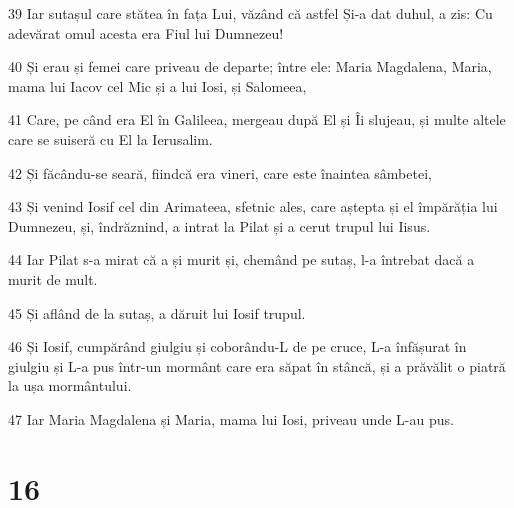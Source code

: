 \par 39 Iar sutașul care stătea în fața Lui, văzând că astfel Și-a dat duhul, a zis: Cu adevărat omul acesta era Fiul lui Dumnezeu!
\par 40 Și erau și femei care priveau de departe; între ele: Maria Magdalena, Maria, mama lui Iacov cel Mic și a lui Iosi, și Salomeea,
\par 41 Care, pe când era El în Galileea, mergeau după El și Îi slujeau, și multe altele care se suiseră cu El la Ierusalim.
\par 42 Și făcându-se seară, fiindcă era vineri, care este înaintea sâmbetei,
\par 43 Și venind Iosif cel din Arimateea, sfetnic ales, care aștepta și el împărăția lui Dumnezeu, și, îndrăznind, a intrat la Pilat și a cerut trupul lui Iisus.
\par 44 Iar Pilat s-a mirat că a și murit și, chemând pe sutaș, l-a întrebat dacă a murit de mult.
\par 45 Și aflând de la sutaș, a dăruit lui Iosif trupul.
\par 46 Și Iosif, cumpărând giulgiu și coborându-L de pe cruce, L-a înfășurat în giulgiu și L-a pus într-un mormânt care era săpat în stâncă, și a prăvălit o piatră la ușa mormântului.
\par 47 Iar Maria Magdalena și Maria, mama lui Iosi, priveau unde L-au pus.

\chapter{16}

